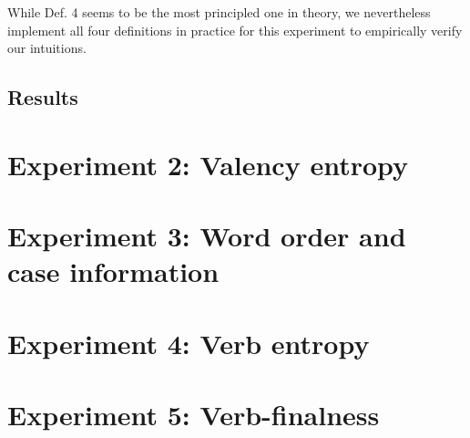 While Def. 4 seems to be the most principled one in theory, we nevertheless implement all four definitions in practice for this experiment to empirically verify our intuitions. 

\subsection{Results}


\section{Experiment 2: Valency entropy}

\section{Experiment 3: Word order and case information}

\section{Experiment 4: Verb entropy}

\section{Experiment 5: Verb-finalness}